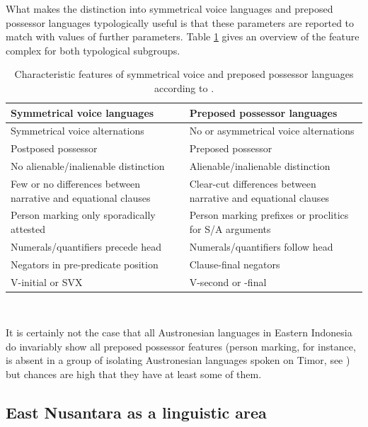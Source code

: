 What makes the distinction into symmetrical voice languages and preposed possessor languages typologically useful is that these parameters are reported to match with values of further parameters. Table \ref{table:sympre} gives an overview of the feature complex for both typological subgroups. 

\begin{table}[ht]

\begin{footnotesize}
\begin{tabular}{p{6cm} p{6cm}}
\hline\hline
Symmetrical voice languages & Preposed possessor languages \tabularnewline
\hline
Symmetrical voice alternations & No or asymmetrical voice alternations \tabularnewline
Postposed possessor & Preposed possessor \tabularnewline
No alienable/inalienable distinction & Alienable/inalienable distinction \tabularnewline
Few or no differences between narrative and equational clauses & Clear-cut differences between narrative and equational clauses \tabularnewline
Person marking only sporadically attested & Person marking prefixes or proclitics for S/A arguments \tabularnewline
Numerals/quantifiers precede head & Numerals/quantifiers follow head \tabularnewline
Negators in pre-predicate position & Clause-final negators \tabularnewline
V-initial or SVX & V-second or -final \tabularnewline
\hline
\end{tabular}
\caption[Characteristic features of symmetrical voice and preposed possessor languages]{Characteristic features of symmetrical voice and preposed possessor languages according to \citet[175]{Himmelmann2005austronesian}.}
\label{table:sympre}
\end{footnotesize}

\end{table}
\

It is certainly not the case that all Austronesian languages in Eastern Indonesia do invariably show all preposed possessor features (person marking, for instance, is absent in a group of isolating Austronesian languages spoken on Timor, see \citealt[175]{Himmelmann2005austronesian}) but chances are high that they have at least some of them. 

\subsection{East Nusantara as a linguistic area}\label{sec:nusantara}

